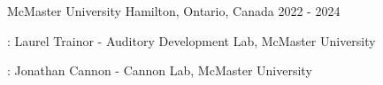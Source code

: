

\begin{cventries}

  \cventry
    {} %
    {McMaster University} %
    {Hamilton, Ontario, Canada} %
    { 2022 -  2024} %
    {%
      \begin{cvitems} %
        \item {}: Laurel Trainor - 
          Auditory Development Lab, McMaster University
      \item {}: Jonathan Cannon - 
          Cannon Lab, McMaster University
      \end{cvitems}
    }


\end{cventries}
